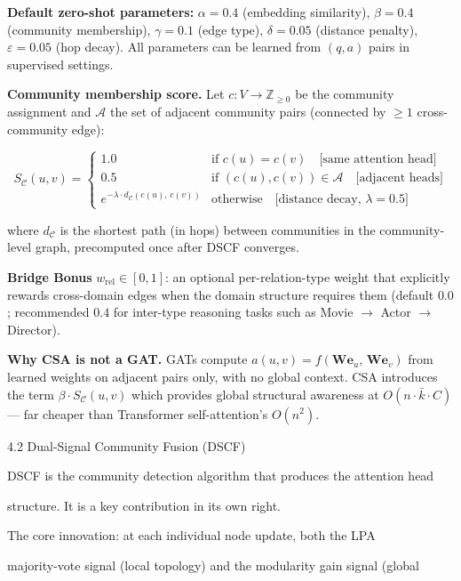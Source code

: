 \documentclass[10pt,journal,compsoc]{IEEEtran}
\begin{document}
\textbf{Default zero-shot parameters:} $\alpha = 0.4$ (embedding similarity), $\beta = 0.4$ (community membership), $\gamma = 0.1$ (edge type), $\delta = 0.05$ (distance penalty), $\varepsilon = 0.05$ (hop decay). All parameters can be learned from $(q, a)$ pairs in supervised settings.

\textbf{Community membership score.} Let $c: V \to \mathbb{Z}_{\geq 0}$ be the community assignment and $\mathcal{A}$ the set of adjacent community pairs (connected by $\geq 1$ cross-community edge):

\begin{equation}
S_{\mathcal{C}}(u,v) = \begin{cases} 1.0 & \text{if } c(u) = c(v) \quad \text{[same attention head]} \\ 0.5 & \text{if } (c(u), c(v)) \in \mathcal{A} \quad \text{[adjacent heads]} \\ e^{-\lambda \cdot d_{\mathcal{C}}(c(u),\, c(v))} & \text{otherwise} \quad \text{[distance decay, } \lambda = 0.5\text{]} \end{cases}
\end{equation}

where $d_{\mathcal{C}}$ is the shortest path (in hops) between communities in the community-level graph, precomputed once after DSCF converges.

\textbf{Bridge Bonus} $w_{\mathrm{rel}} \in [0, 1]$: an optional per-relation-type weight that explicitly rewards cross-domain edges when the domain structure requires them (default $0.0$; recommended $0.4$ for inter-type reasoning tasks such as Movie $\to$ Actor $\to$ Director).

\textbf{Why CSA is not a GAT.} GATs compute $a(u,v) = f(\mathbf{W}\mathbf{e}_u,\, \mathbf{W}\mathbf{e}_v)$ from learned weights on adjacent pairs only, with no global context. CSA introduces the term $\beta \cdot S_{\mathcal{C}}(u,v)$ which provides global structural awareness at $O(n \cdot \bar{k} \cdot C)$ — far cheaper than Transformer self-attention's $O(n^2)$.

4.2 Dual-Signal Community Fusion (DSCF)

DSCF is the community detection algorithm that produces the attention head

structure. It is a key contr\-ibution in its own right.

The core innovation: at each individual node update, both the LPA

majority-vote signal (local topology) and the modularity gain signal (global
\end{document}
